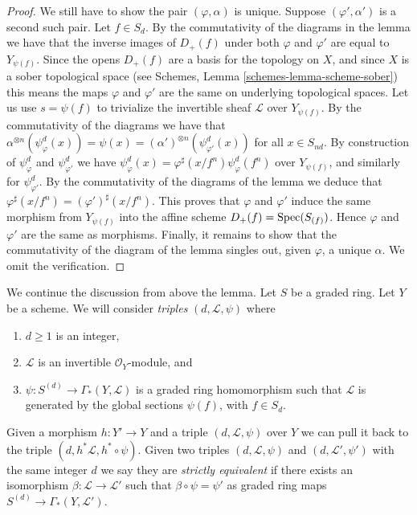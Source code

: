 \begin{proof}
\medskip\noindent
We still have to show the pair $(\varphi, \alpha)$ is unique.
Suppose $(\varphi', \alpha')$ is a second such pair.
Let $f \in S_d$. By the commutativity of the diagrams in the lemma we have
that the inverse images of $D_{+}(f)$ under both $\varphi$ and $\varphi'$
are equal to $Y_{\psi(f)}$. Since the opens $D_{+}(f)$ are a basis
for the topology on $X$, and since $X$ is a sober topological
space (see Schemes, Lemma \ref{schemes-lemma-scheme-sober})
this means the maps $\varphi$ and $\varphi'$ are the same
on underlying topological spaces. Let us use $s = \psi(f)$ to
trivialize the invertible sheaf $\mathcal{L}$ over $Y_{\psi(f)}$.
By the commutativity of the diagrams we have that
$\alpha^{\otimes n}(\psi^d_{\varphi}(x)) =
\psi(x) = (\alpha')^{\otimes n}(\psi^d_{\varphi'}(x))$
for all $x \in S_{nd}$. By construction of $\psi^d_{\varphi}$
and $\psi^d_{\varphi'}$ we have
$\psi^d_{\varphi}(x) = \varphi^\sharp(x/f^n) \psi^d_{\varphi}(f^n)$
over $Y_{\psi(f)}$,
and similarly for $\psi^d_{\varphi'}$. By the commutativity of
the diagrams of the lemma we deduce that
$\varphi^\sharp(x/f^n) = (\varphi')^\sharp(x/f^n)$.
This proves that $\varphi$ and $\varphi'$ induce the same morphism
from $Y_{\psi(f)}$ into the affine scheme $D_{+}(f) = \mathop{\mathrm{Spec}}(S_{(f)})$.
Hence $\varphi$ and $\varphi'$ are the same as morphisms.
Finally, it remains to show that the commutativity of the
diagram of the lemma singles out, given $\varphi$, a unique
$\alpha$. We omit the verification.
\end{proof}

\noindent
We continue the discussion from above the lemma.
Let $S$ be a graded ring.
Let $Y$ be a scheme. We will consider {\it triples}
$(d, \mathcal{L}, \psi)$ where
\begin{enumerate}
\item $d \geq 1$ is an integer,
\item $\mathcal{L}$ is an invertible $\mathcal{O}_Y$-module, and
\item $\psi : S^{(d)} \to \Gamma_*(Y, \mathcal{L})$ is a graded
ring homomorphism such that $\mathcal{L}$ is generated by
the global sections $\psi(f)$, with $f \in S_d$.
\end{enumerate}
Given a morphism $h : Y' \to Y$ and a triple
$(d, \mathcal{L}, \psi)$ over $Y$ we can pull it back to the
triple $(d, h^*\mathcal{L}, h^* \circ \psi)$.
Given two triples $(d, \mathcal{L}, \psi)$ and
$(d, \mathcal{L}', \psi')$ with the same integer $d$
we say they are {\it strictly equivalent} if there exists
an isomorphism $\beta : \mathcal{L} \to \mathcal{L}'$
such that $\beta \circ \psi = \psi'$ as graded
ring maps $S^{(d)} \to \Gamma_*(Y, \mathcal{L}')$.

